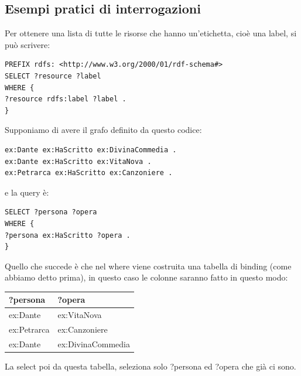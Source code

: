 \subsection{Esempi pratici di interrogazioni}
Per ottenere una lista di tutte le risorse che hanno un'etichetta, cioè una label, si può scrivere:
\begin{lstlisting}
PREFIX rdfs: <http://www.w3.org/2000/01/rdf-schema#>
SELECT ?resource ?label
WHERE {
?resource rdfs:label ?label .
} 
\end{lstlisting}
Supponiamo di avere il grafo definito da questo codice:
\begin{lstlisting}
ex:Dante ex:HaScritto ex:DivinaCommedia .
ex:Dante ex:HaScritto ex:VitaNova .
ex:Petrarca ex:HaScritto ex:Canzoniere .
\end{lstlisting}
e la query è:
\begin{lstlisting}
SELECT ?persona ?opera
WHERE {
?persona ex:HaScritto ?opera .
}
\end{lstlisting}
Quello che succede è che nel where viene costruita una tabella di binding (come abbiamo detto prima), in questo caso le
colonne saranno fatto in questo modo:

\begin{center}
\begin{tabular}{|l|l|}
\hline
\textbf{?persona} & \textbf{?opera} \\ \hline
ex:Dante & ex:VitaNova \\ \hline
ex:Petrarca & ex:Canzoniere \\ \hline
ex:Dante & ex:DivinaCommedia \\ \hline
\end{tabular}
\end{center}
La select poi da questa tabella, seleziona solo ?persona ed ?opera che già ci sono.


